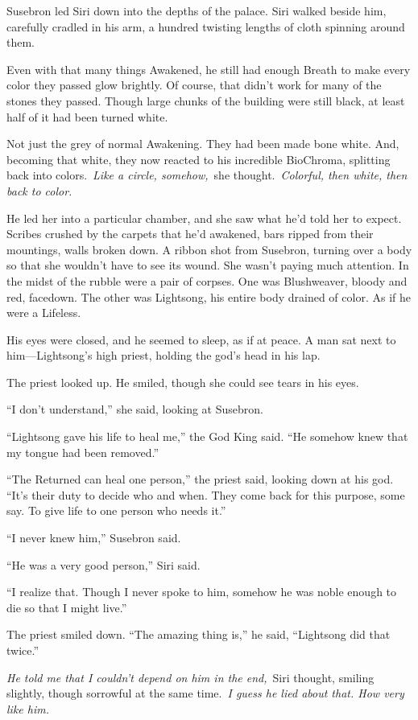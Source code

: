 Susebron led Siri down into the depths of the palace. Siri walked beside him, carefully cradled in his arm, a hundred twisting lengths of cloth spinning around them.

Even with that many things Awakened, he still had enough Breath to make every color they passed glow brightly. Of course, that didn’t work for many of the stones they passed. Though large chunks of the building were still black, at least half of it had been turned white.

Not just the grey of normal Awakening. They had been made bone white. And, becoming that white, they now reacted to his incredible BioChroma, splitting back into colors.~\textit{Like a circle, somehow,}~she thought.~\textit{Colorful, then white, then back to color.}

He led her into a particular chamber, and she saw what he’d told her to expect. Scribes crushed by the carpets that he’d awakened, bars ripped from their mountings, walls broken down. A ribbon shot from Susebron, turning over a body so that she wouldn’t have to see its wound. She wasn’t paying much attention. In the midst of the rubble were a pair of corpses. One was Blushweaver, bloody and red, facedown. The other was Lightsong, his entire body drained of color. As if he were a Lifeless.

His eyes were closed, and he seemed to sleep, as if at peace. A man sat next to him—Lightsong’s high priest, holding the god’s head in his lap.

The priest looked up. He smiled, though she could see tears in his eyes.

“I don’t understand,” she said, looking at Susebron.

“Lightsong gave his life to heal me,” the God King said. “He somehow knew that my tongue had been removed.”

“The Returned can heal one person,” the priest said, looking down at his god. “It’s their duty to decide who and when. They come back for this purpose, some say. To give life to one person who needs it.”

“I never knew him,” Susebron said.

“He was a very good person,” Siri said.

“I realize that. Though I never spoke to him, somehow he was noble enough to die so that I might live.”

The priest smiled down. “The amazing thing is,” he said, “Lightsong did that twice.”

\textit{He told me that I couldn’t depend on him in the end,}~Siri thought, smiling slightly, though sorrowful at the same time.~\textit{I guess he lied about that. How very like him.}

